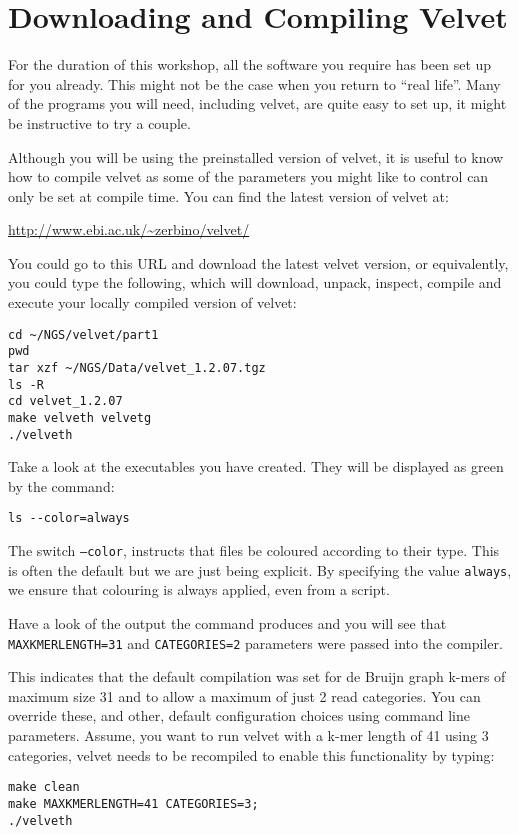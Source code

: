 \section{Downloading and Compiling Velvet}
\begin{note}
For the duration of this workshop, all the software you require has been set up
for you already. This might not be the case when you return to ``real life''. Many
of the programs you will need, including velvet, are quite easy to set up, it
might be instructive to try a couple.
\end{note}

\begin{information}
Although you will be using the preinstalled version of velvet, it is useful to
know how to compile velvet as some of the parameters you might like to control
can only be set at compile time. You can find the latest version of velvet at:

{\centering
\url{http://www.ebi.ac.uk/~zerbino/velvet/}
 
}

You could go to this URL and download the latest velvet version, or
equivalently, you could type the following, which will download, unpack,
inspect, compile and execute your locally compiled version of velvet:
\begin{lstlisting}
cd ~/NGS/velvet/part1
pwd
tar xzf ~/NGS/Data/velvet_1.2.07.tgz
ls -R
cd velvet_1.2.07
make velveth velvetg
./velveth
\end{lstlisting}
\end{information}

\begin{steps}
Take a look at the executables you have created. They will be displayed as green
by the command:
\begin{lstlisting}
ls --color=always
\end{lstlisting}
\end{steps}

\begin{note}
The switch \texttt{--color}, instructs that files be coloured according to their
type. This is often the default but we are just being explicit. By specifying
the value \texttt{always}, we ensure that colouring is always applied, even from
a script.
\end{note}

\begin{steps}
Have a look of the output the command produces and you will see that
\texttt{MAXKMERLENGTH=31} and \texttt{CATEGORIES=2} parameters were passed into
the compiler.

This indicates that the default compilation was set for de Bruijn graph k-mers of
maximum size 31 and to allow a maximum of just 2 read categories. You can
override these, and other, default configuration choices using command line
parameters. Assume, you want to run velvet with a k-mer length of 41 using 3
categories, velvet needs to be recompiled to enable this functionality by
typing:
\begin{lstlisting}
make clean
make MAXKMERLENGTH=41 CATEGORIES=3;
./velveth
\end{lstlisting}
\end{steps}

